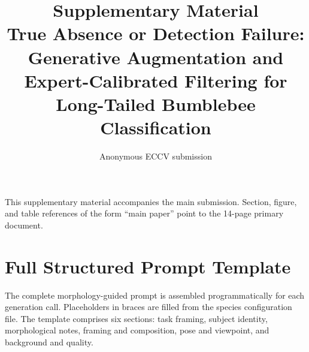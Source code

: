 \documentclass[runningheads]{llncs}
\begin{document}
\title{Supplementary Material\\
\large True Absence or Detection Failure: Generative Augmentation and
Expert-Calibrated Filtering for Long-Tailed Bumblebee Classification}


\author{Anonymous ECCV submission}

\maketitle

\noindent This supplementary material accompanies the main submission.
Section, figure, and table references of the form ``main paper'' point
to the 14-page primary document.


\section{Full Structured Prompt Template}
\label{sec:suppl-prompt}

The complete morphology-guided prompt is assembled programmatically for
each generation call. Placeholders in braces are filled from the
species configuration file. The template comprises six sections: task
framing, subject identity, morphological notes, framing and
composition, pose and viewpoint, and background and quality.
\end{document}
